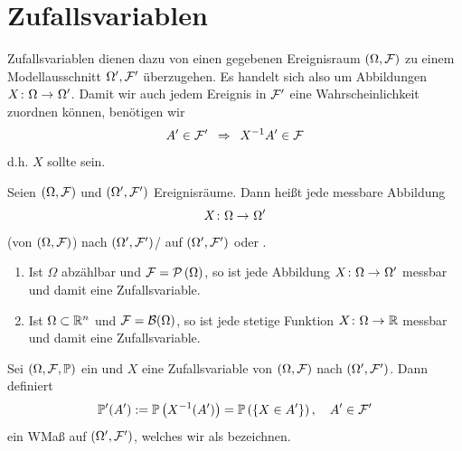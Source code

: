 \section{Zufallsvariablen}

Zufallsvariablen dienen dazu von einen gegebenen Ereignisraum $(\Omega, \mathcal{F})$ zu einem Modellausschnitt $\Omega', \mathcal{F}'$ überzugehen. 
Es handelt sich also um Abbildungen $\abb{X}{\Omega}{\Omega'}$.
Damit wir auch jedem Ereignis in $\mathcal{F}'$ eine Wahrscheinlichkeit zuordnen können, benötigen wir	
\begin{equation*}
    A' \in \mathcal{F}' \enskip \Rightarrow \enskip X^{-1} A' \in \mathcal{F}		
\end{equation*}
d.h. $X$ sollte  sein.

\begin{definition}[Zufallsvariable]
    Seien $(\Omega, \mathcal{F})$ und $(\Omega', \mathcal{F}')$ Ereignisräume. Dann heißt jede messbare Abbildung
    \begin{equation*}
        \abb{X}{\Omega}{\Omega'}
    \end{equation*}
     (von $(\Omega, \mathcal{F})$) nach $(\Omega', \mathcal{F}')$/ auf $(\Omega', \mathcal{F}')$ oder .
\end{definition}

\begin{beispiel}
    \begin{enumerate}[leftmargin=*]
        \item Ist $\Omega$ abzählbar und $\mathcal{F} = \mathcal{P}\left( \Omega \right)$, so ist jede Abbildung $\abb{X}{\Omega}{\Omega'}$ messbar und damit eine Zufallsvariable.
        \item Ist $\Omega \subset \mathbb{R}^n$ und $\mathcal{F} = \mathcal{B}(\Omega)$, so ist jede stetige Funktion $\abb{X}{\Omega}{\R}$ messbar und damit eine Zufallsvariable.
    \end{enumerate}
\end{beispiel}

\begin{satz}
    Sei $(\Omega, \mathcal{F}, \mathbb{P})$ ein \WRaum und $X$ eine Zufallsvariable von $(\Omega, \mathcal{F})$ nach $(\Omega', \mathcal{F}')$. Dann definiert
    \begin{equation*}
    \mathbb{P}'(A') \mathrel{:=} \mathbb{P}\left(X^{-1}(A')\right) = \mathbb{P}\left(\left\{ X \in A' \right\}\right), \quad A' \in \mathcal{F}'
    \end{equation*}
    ein WMaß auf $(\Omega', \mathcal{F}')$, welches wir als  bezeichnen.
\end{satz}

